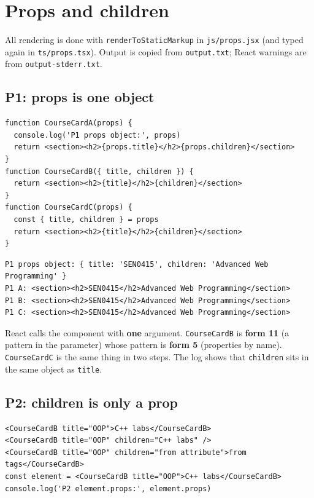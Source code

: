 \documentclass[
  10pt,
]{article}
\begin{document}
\hypertarget{props-and-children}{%
\section{Props and children}\label{props-and-children}}

All rendering is done with \texttt{renderToStaticMarkup} in
\texttt{js/\allowbreak{}props.\allowbreak{}jsx} (and typed again in
\texttt{ts/\allowbreak{}props.\allowbreak{}tsx}). Output is copied from
\texttt{output.\allowbreak{}txt}; React warnings are from
\texttt{output-stderr.\allowbreak{}txt}.

\hypertarget{p1-props-is-one-object}{%
\subsection{P1: props is one object}\label{p1-props-is-one-object}}

\begin{verbatim}
function CourseCardA(props) {
  console.log('P1 props object:', props)
  return <section><h2>{props.title}</h2>{props.children}</section>
}
function CourseCardB({ title, children }) {
  return <section><h2>{title}</h2>{children}</section>
}
function CourseCardC(props) {
  const { title, children } = props
  return <section><h2>{title}</h2>{children}</section>
}
\end{verbatim}

\begin{verbatim}
P1 props object: { title: 'SEN0415', children: 'Advanced Web Programming' }
P1 A: <section><h2>SEN0415</h2>Advanced Web Programming</section>
P1 B: <section><h2>SEN0415</h2>Advanced Web Programming</section>
P1 C: <section><h2>SEN0415</h2>Advanced Web Programming</section>
\end{verbatim}

React calls the component with \textbf{one} argument.
\texttt{CourseCardB} is \textbf{form 11} (a pattern in the parameter)
whose pattern is \textbf{form 5} (properties by name).
\texttt{CourseCardC} is the same thing in two steps. The log shows that
\texttt{children} sits in the same object as \texttt{title}.

\hypertarget{p2-children-is-only-a-prop}{%
\subsection{P2: children is only a
prop}\label{p2-children-is-only-a-prop}}

\begin{verbatim}
<CourseCardB title="OOP">C++ labs</CourseCardB>
<CourseCardB title="OOP" children="C++ labs" />
<CourseCardB title="OOP" children="from attribute">from tags</CourseCardB>
const element = <CourseCardB title="OOP">C++ labs</CourseCardB>
console.log('P2 element.props:', element.props)
\end{verbatim}
\end{document}
